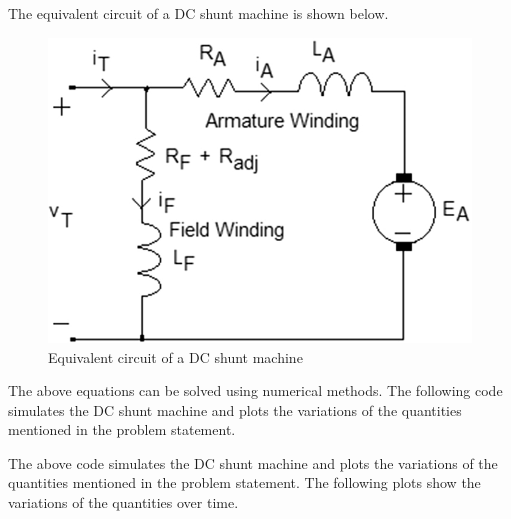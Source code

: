 \documentclass[a4paper,12pt]{article}
\begin{document}
The equivalent circuit of a DC shunt machine is shown below.
\begin{figure}[h!]
    \centering
    \includegraphics*[scale=0.5]{./figs/circuit.png}
    \caption{Equivalent circuit of a DC shunt machine}
    \label{fig:dc_shunt_machine}
\end{figure}

The above equations can be solved using numerical methods. The following code simulates the DC shunt machine and plots the variations of the quantities mentioned in the problem statement.

\newpage



The above code simulates the DC shunt machine and plots the variations of the quantities mentioned in the problem statement. The following plots show the variations of the quantities over time.
\end{document}
